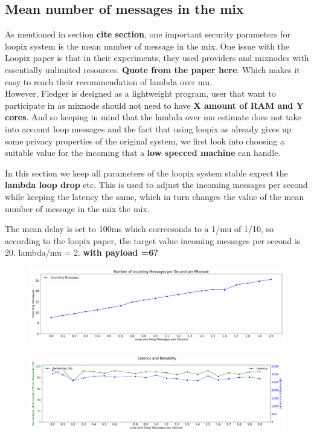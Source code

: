 \documentclass[a4paper,11pt,oneside]{report}
\begin{document}
\subsection{Mean number of messages in the mix}
As mentioned in section \textbf{cite section}, one important security parameters for loopix system is the mean number of message in the mix. One issue with the Loopix paper is that in their experiments, they used providers and mixnodes with essentially unlimited resources. \textbf{Quote from the paper here}. Which makes it easy to reach their recommendation of lambda over mu. \\
However, Fledger is designed as a lightweight program, user that want to participate in as mixnode should not need to have \textbf{X amount of RAM and Y cores}. And so keeping in mind that the lambda over mu estimate does not take into account loop messages and the fact that using loopix as already gives up some privacy properties of the original system, we first look into choosing a suitable value for the incoming that a \textbf{low specced machine} can handle.

In this section we keep all parameters of the loopix system stable expect the \textbf{lambda loop drop} etc. This is used to adjust the incoming messages per second while keeping the latency the same, which in turn changes the value of the mean number of message in the mix the mix.

The mean delay is set to 100ms which correcsonds to a 1/mu of 1/10, so according to the loopix paper, the target value incoming messages per second is 20. lambda/mu = 2. \textbf{with payload =6?}

\begin{figure}[htbp]
    \centering
    \includegraphics[width=\textwidth]{plots/mu_incoming_messages.png}
    \caption{}
    \label{fig:mu_incoming}
\end{figure}

\begin{figure}[htbp]
    \centering
    \includegraphics[width=\textwidth]{plots/mu_reliability_latency.png}
    \caption{}
    \label{fig:mu_reliability_latency}
\end{figure}
\end{document}
